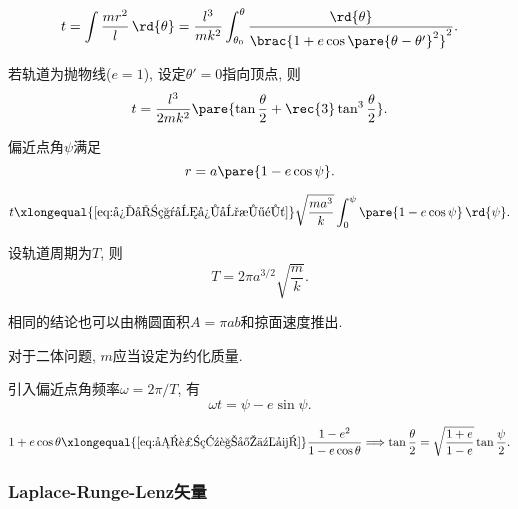\documentclass[../TheoreticalMechanics.tex]{subfiles}
\begin{document}
\begin{theorem}[时间对角度的方程]\quad
	\[ t = \int \frac{mr^2}{l}\,\rd{\theta} = \frac{l^3}{mk^2}\int_{\theta_0}^\theta \frac{\rd{\theta}}{\brac{1+e\cos\pare{\theta-\theta'}^2}^2}. \]
\end{theorem}
\begin{corollary}[抛物线情形的时间方程]
	若轨道为抛物线($e=1$), 设定$\theta' = 0$指向顶点, 则
	\[ t = \frac{l^3}{2mk^2}\pare{\tan\frac{\theta}{2} + \rec{3}\tan^3\frac{\theta}{2}}. \]
\end{corollary}
\begin{definition}[偏近点角]
	偏近点角$\psi$满足
	\begin{equation}
		\label{eq:偏近点角定义式}
		r=a\pare{1-e\cos\psi}.
	\end{equation}
\end{definition}
\begin{theorem}[时间的对偏近点角的方程]\quad
	\[ t \xlongequal{\eqref{eq:径向积分得到时间}} \sqrt{\frac{ma^3}{k}}\int_0^\psi\pare{1-e\cos\psi}\,\rd{\psi}. \]
\end{theorem}
\begin{finale}
	\begin{corollary}[Kepler第三定律]
		设轨道周期为$T$, 则
		\[ T = 2\pi a^{3/2}\sqrt{\frac{m}{k}}. \]
	\end{corollary}
\end{finale}
\begin{remark}
	相同的结论也可以由椭圆面积$A=\pi ab$和掠面速度推出.
\end{remark}
\begin{pitfall}
	对于二体问题, $m$应当设定为约化质量.
\end{pitfall}
\begin{corollary}[Kepler方程]
	引入偏近点角频率$\omega = 2\pi/T$, 有
	\[ \omega t = \psi - e\sin\psi. \]
\end{corollary}
\begin{theorem}[偏近点角的确定]\quad
	\[ 1+e\cos\theta \xlongequal{\eqref{eq:偏近点角定义式}} \frac{1-e^2}{1-e\cos\theta} \Longrightarrow \tan\frac{\theta}{2} = \sqrt{\frac{1+e}{1-e}}\tan\frac{\psi}{2}. \]
\end{theorem}


\subsubsection{Laplace-Runge-Lenz矢量} %
\label{ssub:laplace_runge_lenz矢量}
\end{document}
